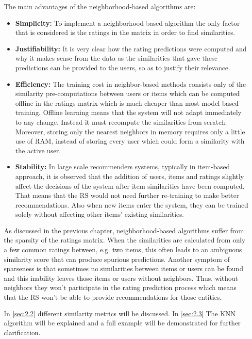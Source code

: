 The main advantages of the neighborhood-based algorithms\citep{Ricci} are:
\begin{itemize}
	\item \textbf{Simplicity:} To implement a neighborhood-based algorithm
	the only factor that is considered is the ratings in the matrix in order
	to find similarities.
	\item \textbf{Justifiability:} It is very clear how the rating
	predictions were computed and why it makes sense from the data as the
	similarities that gave these predictions can be provided to the users, so
	as to justify their relevance.
	\item \textbf{Efficiency:} The training cost in neighbor-based methods
	consists only of the similarity pre-computations between users or items
	which can be computed offline in the ratings matrix which is much cheaper than
	most model-based training. Offline learning means that the system
	will not adapt immediately to any change. Instead it must recompute
	the similarities from scratch. Moreover, storing only the nearest neighbors
	in memory requires only a little use of RAM, instead of storing every user
	which could form a similarity with the active user.
	\item \textbf{Stability:} In large scale recommenders systems, typically in
	item-based approach, it is observed that the addition of users, items and ratings slightly
	affect the decisions of the system after item similarities have been computed.
	That means that the RS would not need further re-training to make better recommendations.
	Also when new items enter the system, they can be trained solely without affecting other items'
	existing similarities.
\end{itemize}

As discussed in the previous chapter, neighborhood-based algorithms suffer from the sparsity of
the ratings matrix. When the similarities are calculated from
only a few common ratings between, e.g. two items, this often leads to
an ambiguous similarity score that can produce spurious predictions.
Another symptom of sparseness is that sometimes no similarities between
items or users can be found and this inability leaves those items or users
without neighbors. Thus, without neighbors they won't participate in
the rating prediction process which means that the RS won't be able to provide
recommendations for those entities.

In \autoref{sec:2.2} different similarity metrics will be discussed.
In \autoref{sec:2.3} The KNN algorithm will be explained and a full example will be
demonstrated for further clarification.

